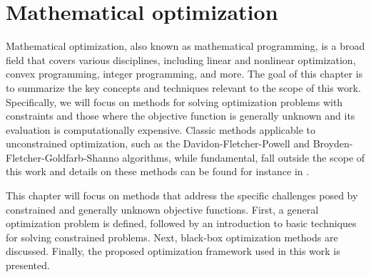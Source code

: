 \chapter{Mathematical optimization}\label{optimization}

Mathematical optimization, also known as mathematical programming, is a broad field that covers various disciplines, including linear and nonlinear optimization, convex programming, integer programming, and more. The goal of this chapter is to summarize the key concepts and techniques relevant to the scope of this work. Specifically, we will focus on methods for solving optimization problems with constraints and those where the objective function is generally unknown and its evaluation is computationally expensive. Classic methods applicable to unconstrained optimization, such as the Davidon-Fletcher-Powell \cite{Fletcher1963} and Broyden-Fletcher-Goldfarb-Shanno \cite{broyden1970} algorithms, while fundamental, fall outside the scope of this work and details on these methods can be found for instance in \cite{Bert}.

This chapter will focus on methods that address the specific challenges posed by constrained and generally unknown objective functions. First, a general optimization problem is defined, followed by an introduction to basic techniques for solving constrained problems. Next, black-box optimization methods are discussed. Finally, the proposed optimization framework used in this work is presented.





